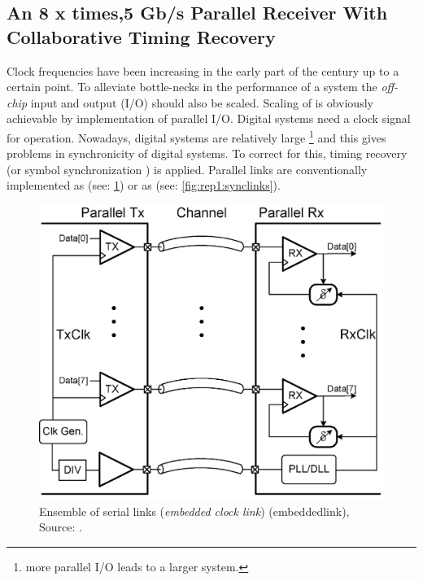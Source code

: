 
\subsection{An 8 x times,5 Gb/s Parallel Receiver With Collaborative Timing Recovery \cite{agrawal20098}}  \label{ss:agrawal20098}

Clock frequencies have been increasing in the early part of the century up to a certain point.
To alleviate bottle-necks in the performance of a system the \textit{off-chip} input and output (I/O) should also be scaled.
Scaling of  is obviously achievable by implementation of parallel I/O.
Digital systems need a clock signal for operation.
Nowadays, digital systems are relatively large \footnote{more parallel I/O leads to a larger system.} and this gives problems in synchronicity of digital systems.
To correct for this, timing recovery (or symbol synchronization \cite{mueller1976timing}) is applied.
Parallel links are conventionally implemented as  (see: \cref{fig:rep1:seriallinks}) or as   (see: \cref{fig:rep1:synclinks}).

\begin{figure}[]
	\centering
	\includegraphics[width=0.8\linewidth]{Figures/Rep1SourceSync.png}
	\caption{Ensemble of serial links (\textit{embedded clock link}) (\ac{embeddedlink}), Source: \cite{agrawal20098}.} 
    \label{fig:rep1:seriallinks}
\end{figure}

